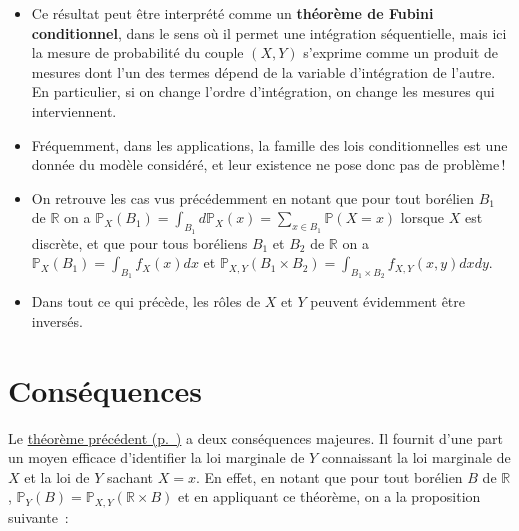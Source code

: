 \begin{remarque}[{A noter}]\label{III-a-noter}

\begin{itemize}
\tightlist
\item
  Ce résultat peut être interprété comme un \textbf{théorème de Fubini
  conditionnel}, dans le sens où il permet une intégration séquentielle,
  mais ici la mesure de probabilité du couple \((X,Y)\) s'exprime comme
  un produit de mesures dont l'un des termes dépend de la variable
  d'intégration de l'autre. En particulier, si on change l'ordre
  d'intégration, on change les mesures qui interviennent.
\item
  Fréquemment, dans les applications, la famille des lois
  conditionnelles est une donnée du modèle considéré, et leur existence
  ne pose donc pas de problème\,!
\item
  On retrouve les cas vus précédemment en notant que pour tout borélien
  \(B_1\) de \(\mathbb{R}\) on a
  \(\mathbb{P}_X(B_1) = \int_{B_1}d\mathbb{P}_X(x) = \sum_{x \in B_1} \mathbb{P}(X=x)\)
  lorsque \(X\) est discrète, et que pour tous boréliens \(B_1\) et
  \(B_2\) de \(\mathbb{R}\) on a
  \(\mathbb{P}_X(B_1) = \int_{B_1} f_X(x)dx\) et
  \(\mathbb{P}_{X,Y}(B_1 \times B_2) = \int_{B_1 \times B_2}f_{X,Y}(x,y) dx dy\).
\item
  Dans tout ce qui précède, les rôles de \(X\) et \(Y\) peuvent
  évidemment être inversés.
\end{itemize}
\end{remarque}

\section{Conséquences}\label{III-consuxe9quences}

Le \protect\hyperref[III-fubinicond]{théorème
précédent (p.~\pageref*{III-fubinicond})} a deux conséquences majeures.
Il fournit d'une part un moyen efficace d'identifier la loi marginale de
\(Y\) connaissant la loi marginale de \(X\) et la loi de \(Y\) sachant
\(X = x\). En effet, en notant que pour tout borélien \(B\) de
\(\mathbb{R}\),
\(\mathbb{P}_Y(B) = \mathbb{P}_{X,Y}(\mathbb{R}\times B)\) et en
appliquant ce théorème, on a la proposition suivante~:

